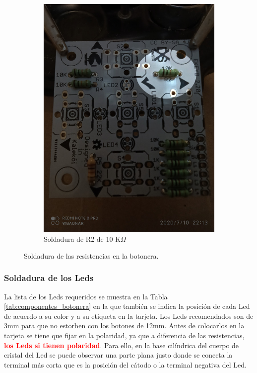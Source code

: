 \documentclass{article}
\begin{document}
\begin{figure}[htbp]
\begin{subfigure}[t]{0.3\textwidth}
        \includegraphics[width=0.9\columnwidth, height=1.2\columnwidth]{images/Botonera/botonera6.jpg}
        \caption{Soldadura de R2 de 10 K$\Omega$}
        \label{fig:botonera_resistencias6}
    \end{subfigure}
    \caption{Soldadura de las resistencias en la botonera.}
    \label{fig:botonera_resistencias_parte2}
\end{figure}

\subsubsection{Soldadura de los Leds}
La lista de los Leds requeridos se muestra en la Tabla \ref{tab:componentes_botonera} en la que también se indica la posición de cada Led de acuerdo a su color y a su etiqueta en la tarjeta. Los Leds recomendados son de 3mm para que no estorben con los botones de 12mm. Antes de colocarlos en la tarjeta se tiene que fijar en la polaridad, ya que a diferencia de las resistencias, \textbf{\textcolor{red}{los Leds si tienen polaridad}}. Para ello, en la base cilíndrica del cuerpo de cristal del Led se puede observar una parte plana justo donde se conecta la terminal más corta que es la posición del cátodo o la terminal negativa del Led. 
\end{document}
